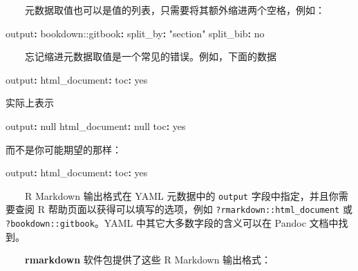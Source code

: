 \documentclass[
  12pt,
]{krantz}
\newenvironment{Shaded}{\begin{snugshade}}{\end{snugshade}}
\newcommand{\AttributeTok}[1]{\textcolor[rgb]{0.77,0.63,0.00}{#1}}
\newcommand{\CharTok}[1]{\textcolor[rgb]{0.31,0.60,0.02}{#1}}
\newcommand{\FunctionTok}[1]{\textcolor[rgb]{0.00,0.00,0.00}{#1}}
\newcommand{\KeywordTok}[1]{\textcolor[rgb]{0.13,0.29,0.53}{\textbf{#1}}}
\newcommand{\StringTok}[1]{\textcolor[rgb]{0.31,0.60,0.02}{#1}}
\theoremstyle{definition}
\theoremstyle{definition}
\theoremstyle{definition}
\theoremstyle{definition}
\theoremstyle{remark}
\begin{document}
  元数据取值也可以是值的列表，只需要将其额外缩进两个空格，例如：

\begin{Shaded}
\begin{Highlighting}[]
\FunctionTok{output}\KeywordTok{:}
\AttributeTok{  bookdown:}\FunctionTok{:gitbook}\KeywordTok{:}
\AttributeTok{    }\FunctionTok{split\_by}\KeywordTok{:}\AttributeTok{ }\StringTok{"section"}
\AttributeTok{    }\FunctionTok{split\_bib}\KeywordTok{:}\AttributeTok{ }\CharTok{no}
\end{Highlighting}
\end{Shaded}

  忘记缩进元数据取值是一个常见的错误。例如，下面的数据

\begin{Shaded}
\begin{Highlighting}[]
\FunctionTok{output}\KeywordTok{:}
\FunctionTok{html\_document}\KeywordTok{:}
\FunctionTok{toc}\KeywordTok{:}\AttributeTok{ }\CharTok{yes}
\end{Highlighting}
\end{Shaded}

实际上表示

\begin{Shaded}
\begin{Highlighting}[]
\FunctionTok{output}\KeywordTok{:}\AttributeTok{ }\CharTok{null}
\FunctionTok{html\_document}\KeywordTok{:}\AttributeTok{ }\CharTok{null}
\FunctionTok{toc}\KeywordTok{:}\AttributeTok{ }\CharTok{yes}
\end{Highlighting}
\end{Shaded}

而不是你可能期望的那样：

\begin{Shaded}
\begin{Highlighting}[]
\FunctionTok{output}\KeywordTok{:}
\AttributeTok{  }\FunctionTok{html\_document}\KeywordTok{:}
\AttributeTok{    }\FunctionTok{toc}\KeywordTok{:}\AttributeTok{ }\CharTok{yes}
\end{Highlighting}
\end{Shaded}

  R Markdown 输出格式在 YAML 元数据中的 \texttt{output} 字段中指定，并且你需要查阅 R 帮助页面以获得可以填写的选项，例如 \texttt{?rmarkdown::html\_document} 或 \texttt{?bookdown::gitbook}。YAML 中其它大多数字段的含义可以在 Pandoc 文档中找到。

  \textbf{rmarkdown} 软件包提供了这些 R Markdown 输出格式：
\end{document}

